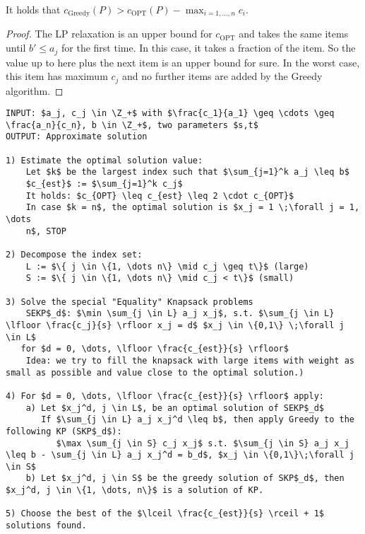 It holds that $c_{\text{Greedy}}(P) > c_{\text{OPT}}(P) - \max_{i=1, \dots, n} c_i$.
\begin{proof}
The LP relaxation is an upper bound for $c_{\text{OPT}}$ and takes the same
items until $b' \leq a_j$ for the first time. In this case, it takes a
fraction of the item. So the value up to here plus the next item is an upper
bound for sure. In the worst case, this item has maximum $c_j$ and no
further items are added by the Greedy algorithm.
\end{proof}


\begin{lstlisting}[caption=FPTAS for Knapsack]
INPUT: $a_j, c_j \in \Z_+$ with $\frac{c_1}{a_1} \geq \cdots \geq
\frac{a_n}{c_n}, b \in \Z_+$, two parameters $s,t$
OUTPUT: Approximate solution

1) Estimate the optimal solution value:
	Let $k$ be the largest index such that $\sum_{j=1}^k a_j \leq b$
	$c_{est}$ := $\sum_{j=1}^k c_j$
	It holds: $c_{OPT} \leq c_{est} \leq 2 \cdot c_{OPT}$
	In case $k = n$, the optimal solution is $x_j = 1 \;\forall j = 1, \dots
	n$, STOP

2) Decompose the index set:
	L := $\{ j \in \{1, \dots n\} \mid c_j \geq t\}$ (large)
	S := $\{ j \in \{1, \dots n\} \mid c_j < t\}$ (small)

3) Solve the special "Equality" Knapsack problems
	SEKP$_d$: $\min \sum_{j \in L} a_j x_j$, s.t. $\sum_{j \in L} \lfloor \frac{c_j}{s} \rfloor x_j = d$ $x_j \in \{0,1\} \;\forall j \in L$
   for $d = 0, \dots, \lfloor \frac{c_{est}}{s} \rfloor$
   	Idea: we try to fill the knapsack with large items with weight as small as possible and value close to the optimal solution.)

4) For $d = 0, \dots, \lfloor \frac{c_{est}}{s} \rfloor$ apply:
	a) Let $x_j^d, j \in L$, be an optimal solution of SEKP$_d$
	   If $\sum_{j \in L} a_j x_j^d \leq b$, then apply Greedy to the following KP (SKP$_d$):
	      $\max \sum_{j \in S} c_j x_j$ s.t. $\sum_{j \in S} a_j x_j \leq b - \sum_{j \in L} a_j x_j^d = b_d$, $x_j \in \{0,1\}\;\forall j \in S$
	b) Let $x_j^d, j \in S$ be the greedy solution of SKP$_d$, then $x_j^d, j \in \{1, \dots, n\}$ is a solution of KP.

5) Choose the best of the $\lceil \frac{c_{est}}{s} \rceil + 1$ solutions found.
\end{lstlisting}

